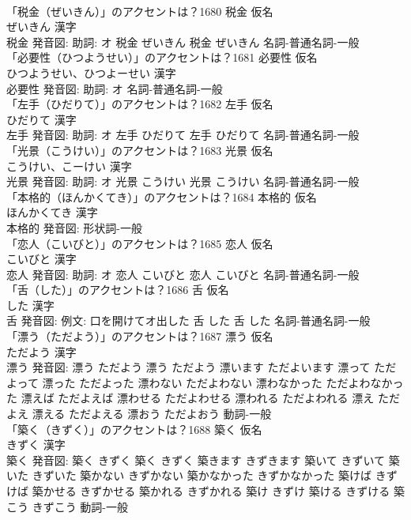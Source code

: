\documentclass[8pt]{extreport}
\begin{document}
\begin{CJK}{UTF8}{min}
\\	「税金（ぜいきん）」のアクセントは？1680	税金 仮名　
\\	ぜいきん 漢字　
\\	税金 発音図: 助詞: オ	税金 ぜいきん		税金 ぜいきん				名詞-普通名詞-一般 
\\	「必要性（ひつようせい）」のアクセントは？1681	必要性 仮名　
\\	ひつようせい、ひつよーせい 漢字　
\\	必要性 発音図: 助詞: オ							名詞-普通名詞-一般 
\\	「左手（ひだりて）」のアクセントは？1682	左手 仮名　
\\	ひだりて 漢字　
\\	左手 発音図: 助詞: オ	左手 ひだりて		左手 ひだりて				名詞-普通名詞-一般 
\\	「光景（こうけい）」のアクセントは？1683	光景 仮名　
\\	こうけい、こーけい 漢字　
\\	光景 発音図: 助詞: オ	光景 こうけい		光景 こうけい				名詞-普通名詞-一般 
\\	「本格的（ほんかくてき）」のアクセントは？1684	本格的 仮名　
\\	ほんかくてき 漢字　
\\	本格的 発音図:							形状詞-一般 
\\	「恋人（こいびと）」のアクセントは？1685	恋人 仮名　
\\	こいびと 漢字　
\\	恋人 発音図: 助詞: オ	恋人 こいびと		恋人 こいびと				名詞-普通名詞-一般 
\\	「舌（した）」のアクセントは？1686	舌 仮名　
\\	した 漢字　
\\	舌 発音図: 例文: 口を開けてオ出した	舌 した		舌 した				名詞-普通名詞-一般 
\\	「漂う（ただよう）」のアクセントは？1687	漂う 仮名　
\\	ただよう 漢字　
\\	漂う 発音図:	漂う ただよう		漂う ただよう 漂います ただよいます 漂って ただよって 漂った ただよった 漂わない ただよわない 漂わなかった ただよわなかった 漂えば ただよえば 漂わせる ただよわせる 漂われる ただよわれる 漂え ただよえ 漂える ただよえる 漂おう ただよおう				動詞-一般 
\\	「築く（きずく）」のアクセントは？1688	築く 仮名　
\\	きずく 漢字　
\\	築く 発音図:	築く きずく		築く きずく 築きます きずきます 築いて きずいて 築いた きずいた 築かない きずかない 築かなかった きずかなかった 築けば きずけば 築かせる きずかせる 築かれる きずかれる 築け きずけ 築ける きずける 築こう きずこう				動詞-一般 

\end{CJK}
\end{document}
